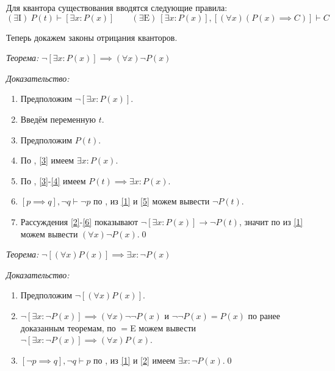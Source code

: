 Для квантора существования вводятся следующие правила:
\[
	(\exists\text{I})~ P(t)\vdash [\exists x:P(x)]\qquad
	(\exists\text{E})~ [\exists x:P(x)],[(\forall x)(P(x)\implies C)]\vdash C
\]

Теперь докажем законы отрицания кванторов.

{\it Теорема:} $\lnot [\exists x:P(x)]\implies  (\forall x)\lnot P(x)$

{\it Доказательство:}
\begin{enumerate}[label=(\arabic*)]
	\item{}\label{1}Предположим $\lnot [\exists x:P(x)]$.
	\item{}\label{2}Введём переменную $t$.
	\item{}\label{3}Предположим $P(t)$.
	\item{}\label{4}По \Eii{}, \ref{3} имеем $\exists x:P(x)$.
	\item{}\label{5}По \implic{}, \ref{3}-\ref{4} имеем $P(t)\implies \exists x:P(x)$.
	\item{}\label{6}${[p\implies q],\lnot q\vdash \lnot p}$ по \taut{}, из
	\ref{1} и \ref{5} можем вывести $\lnot P(t)$.
	\item{}\label{7}Рассуждения \ref{2}-\ref{6} показывают
	$\lnot[\exists x:P(x)]\to\lnot P(t)$, значит по \Aii{} из \ref{1} можем
	вывести $(\forall x)\lnot P(x)$.\qed
\end{enumerate}

{\it Теорема:} $\lnot[(\forall x)P(x)]\implies \exists x:\lnot P(x)$

{\it Доказательство:}
\begin{enumerate}[label=(\arabic*)]
	\item{}\label{1}Предположим $\lnot[(\forall x)P(x)]$.
	\item{}\label{2}${\lnot[\exists x:\lnot P(x)]\implies (\forall x)\lnot\lnot P(x)}$
	и $\lnot\lnot P(x)=P(x)$ по ранее доказанным теоремам, по $=$E можем вывести
	${\lnot[\exists x:\lnot P(x)]\implies (\forall x)P(x)}$.
	\item{}${[\lnot p\implies q], \lnot q\vdash p}$ по \taut{}, из \ref{1} и \ref{2}
	имеем ${\exists x:\lnot P(x)}$.\qed
\end{enumerate}

\pagebreak
